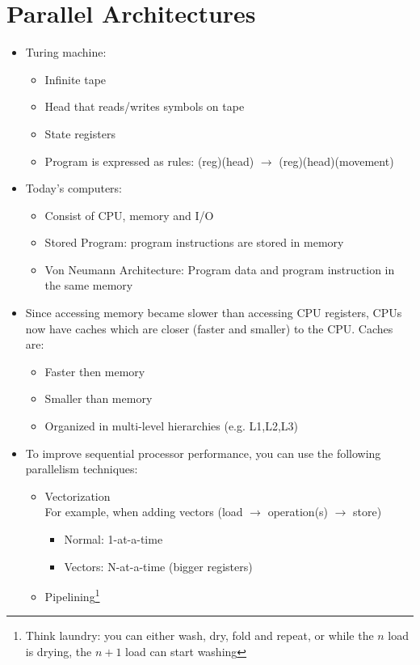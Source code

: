\documentclass[a4paper]{article}
\begin{document}
\section{Parallel Architectures}
\begin{itemize}
\item Turing machine:
\begin{itemize}
\item Infinite tape
\item Head that reads/writes symbols on tape
\item State registers
\item Program is expressed as rules: (reg)(head) $\to$ (reg)(head)(movement)
\end{itemize}
\item Today's computers: 
\begin{itemize}
\item Consist of CPU, memory and I/O
\item Stored Program: program instructions are stored in memory
\item Von Neumann Architecture: Program data and program instruction in the same memory
\end{itemize}
\item Since accessing memory became slower than accessing CPU registers, CPUs now have caches which are closer (faster and smaller) to the CPU. Caches are:
\begin{itemize}
\item Faster then memory
\item Smaller than memory
\item Organized in multi-level hierarchies (e.g. L1,L2,L3)
\end{itemize}
\item To improve sequential processor performance, you can use the following parallelism techniques:
\begin{itemize}
\item Vectorization\\
For example, when adding vectors (load $\to$ operation(s) $\to$ store)
\begin{itemize}
\item Normal: 1-at-a-time
\item Vectors: N-at-a-time (bigger registers)
\end{itemize}
\item Pipelining\footnote{Think laundry: you can either wash, dry, fold and repeat, or while the $n$ load is drying, the $n+1$ load can start washing}

\end{itemize}
\end{itemize}
\end{document}
